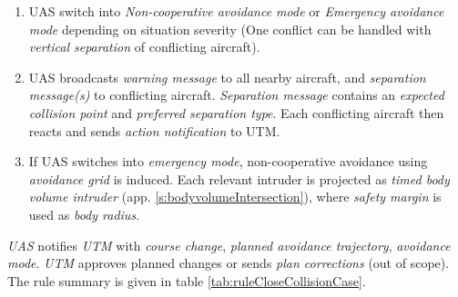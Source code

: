 \begin{enumerate}
    \item UAS switch into \emph{Non-cooperative avoidance mode} or \emph{Emergency avoidance mode} depending on situation severity (One conflict can be handled with \emph{vertical separation} of conflicting aircraft).

    \item UAS broadcasts \emph{warning message} to all nearby aircraft, and \emph{separation message(s)} to conflicting aircraft. \emph{Separation message} contains an \emph{expected collision point} and \emph{preferred separation type}. Each conflicting aircraft then reacts and sends \emph{action notification} to UTM.

    \item If UAS switches into \emph{emergency mode}, non-cooperative avoidance using \emph{avoidance grid} is induced. Each relevant intruder is projected as \emph{timed body volume intruder} (app. \ref{s:bodyvolumeIntersection}), where \emph{safety margin} is used as \emph{body radius}.
\end{enumerate}

\noindent\emph{UAS} notifies \emph{UTM} with \emph{course change}, \emph{planned avoidance trajectory}, \emph{avoidance mode}. \emph{UTM} approves planned changes or sends \emph{plan corrections} (out of scope). The rule summary is given in table \ref{tab:ruleCloseCollisionCase}. 


\newpage


